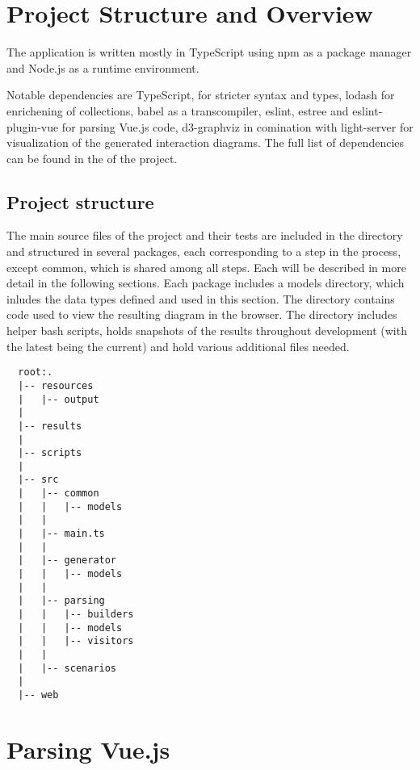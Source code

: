 \section{Project Structure and Overview}
The application is written mostly in TypeScript using npm as a package manager and Node.js as a runtime environment. 

Notable dependencies are TypeScript, for stricter syntax and types, lodash for enrichening of collections, babel as a transcompiler, eslint, estree and eslint-plugin-vue for parsing Vue.js code, d3-graphviz in comination with light-server for visualization of the generated interaction diagrams. The full list of dependencies can be found in the  of the project.


\subsection{Project structure}
The main source files of the project and their tests are included in the  directory and structured in several packages, each corresponding to a step in the process, except common, which is shared among all steps. Each will be described in more detail in the following sections.
Each package includes a models directory, which inludes the data types defined and used in this section.
The  directory contains code used to view the resulting diagram in the browser.
The  directory includes helper bash scripts,  holds snapshots of the results throughout development (with the latest being the current) and  hold various additional files needed.
\begin{lstlisting}
  root:.
  |-- resources
  |   |-- output
  |
  |-- results
  |
  |-- scripts
  |
  |-- src
  |   |-- common
  |   |   |-- models
  |   |
  |   |-- main.ts
  |   |
  |   |-- generator
  |   |   |-- models
  |   |
  |   |-- parsing
  |   |   |-- builders
  |   |   |-- models
  |   |   |-- visitors
  |   |
  |   |-- scenarios
  |
  |-- web
\end{lstlisting}

\section{Parsing Vue.js}

